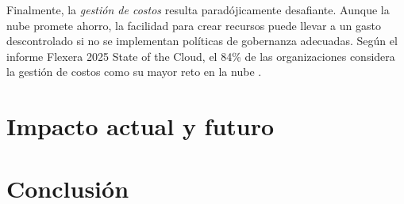 \documentclass[letterpaper,11pt]{article}
\begin{document}
    Finalmente, la \textit{gestión de costos} resulta paradójicamente desafiante. Aunque la nube promete ahorro, la facilidad para crear recursos puede llevar a un gasto descontrolado si no se implementan políticas de gobernanza adecuadas. Según el informe Flexera 2025 State of the Cloud, el 84\% de las organizaciones considera la gestión de costos como su mayor reto en la nube \parencite{finout-cloud-stats2026}.

    \newpage
    \section{Impacto actual y futuro}

    \newpage
    \section{Conclusión}

    \nocite{*}
    \printbibliography[heading=bibintoc, title={Referencias}]
\end{document}
